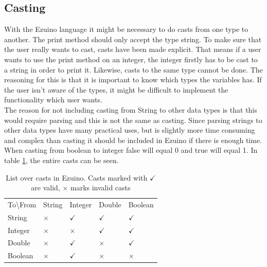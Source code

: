 \subsection*{Casting}
With the Ezuino language it might be necessary to do casts from one type to another.
The print method should only accept the type string. To make sure that the user really wants to cast, casts have been made explicit.
That means if a user wants to use the print method on an integer, the integer firstly has to be cast to a string in order to print it.
Likewise, casts to the same type cannot be done. The reasoning for this is that it is important to know which types the variables has. If the user isn't aware of the types, it might be difficult to implement the functionality which user wants.\\
The reason for not including casting from String to other data types is that this would require parsing and this is not the same as casting. Since parsing strings to other data types have many practical uses, but is slightly more time consuming and complex than casting it should be included in Ezuino if there is enough time.  \\
When casting from boolean to integer false will equal 0 and true will equal 1.
In table \ref{tab:cast-overview}, the entire casts can be seen.
\begin{table}[H]
\centering
\begin{tabular}{lllll}
To\textbackslash From & String   & Integer      & Double       & Boolean      \\
String                & $\times$ & $\checkmark$ & $\checkmark$ & $\checkmark$ \\
Integer               & $\times$ & $\times$     & $\checkmark$ & $\checkmark$ \\
Double                & $\times$ & $\checkmark$ & $\times$     & $\checkmark$ \\
Boolean               & $\times$ & $\checkmark$ & $\times$     & $\times$    
\end{tabular}
\caption{List over casts in Ezuino. Casts marked with $\checkmark$ are valid, $\times$ marks invalid casts}
\label{tab:cast-overview}
\end{table}